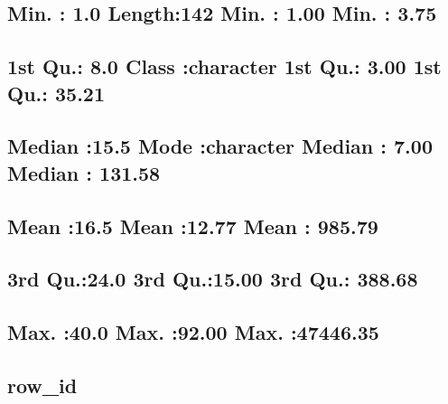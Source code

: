 \documentclass[
]{article}
\begin{document}
\hypertarget{min.-1.0-length142-min.-1.00-min.-3.75}{%
\subsection{Min. : 1.0 Length:142 Min. : 1.00 Min. :
3.75}\label{min.-1.0-length142-min.-1.00-min.-3.75}}

\hypertarget{st-qu.-8.0-class-character-1st-qu.-3.00-1st-qu.-35.21}{%
\subsection{1st Qu.: 8.0 Class :character 1st Qu.: 3.00 1st Qu.:
35.21}\label{st-qu.-8.0-class-character-1st-qu.-3.00-1st-qu.-35.21}}

\hypertarget{median-15.5-mode-character-median-7.00-median-131.58}{%
\subsection{Median :15.5 Mode :character Median : 7.00 Median :
131.58}\label{median-15.5-mode-character-median-7.00-median-131.58}}

\hypertarget{mean-16.5-mean-12.77-mean-985.79}{%
\subsection{Mean :16.5 Mean :12.77 Mean :
985.79}\label{mean-16.5-mean-12.77-mean-985.79}}

\hypertarget{rd-qu.24.0-3rd-qu.15.00-3rd-qu.-388.68}{%
\subsection{3rd Qu.:24.0 3rd Qu.:15.00 3rd Qu.:
388.68}\label{rd-qu.24.0-3rd-qu.15.00-3rd-qu.-388.68}}

\hypertarget{max.-40.0-max.-92.00-max.-47446.35}{%
\subsection{Max. :40.0 Max. :92.00 Max.
:47446.35}\label{max.-40.0-max.-92.00-max.-47446.35}}

\hypertarget{section-33}{%
\subsection{}\label{section-33}}

\hypertarget{row_id-1}{%
\subsection{row\_id}\label{row_id-1}}
\end{document}

